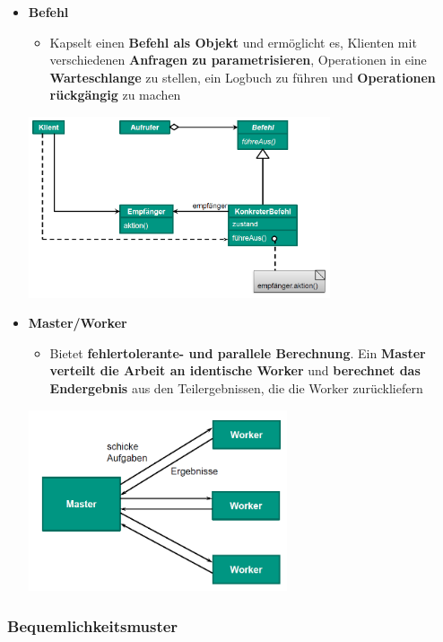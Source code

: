 			\begin{itemize}
				\item \textbf{Befehl}
				\begin{itemize}
					\item Kapselt einen \textbf{Befehl als Objekt} und ermöglicht es, Klienten mit verschiedenen \textbf{Anfragen zu parametrisieren}, Operationen in eine \textbf{Warteschlange} zu stellen, ein Logbuch zu führen und \textbf{Operationen rückgängig} zu machen
				\end{itemize}
				\begin{center}
					\includegraphics[width=0.7\textwidth]{../images/befehl.png}
				\end{center}
				\item \textbf{Master/Worker}
				\begin{itemize}
					\item Bietet \textbf{fehlertolerante- und parallele Berechnung}. Ein \textbf{Master verteilt die Arbeit an identische Worker} und \textbf{berechnet das Endergebnis} aus den Teilergebnissen, die die Worker zurückliefern
				\end{itemize}
				\begin{center}
					\includegraphics[width=0.6\textwidth]{../images/masterWorker.png}
				\end{center}
			\end{itemize}
			
		\subsubsection{Bequemlichkeitsmuster}
				
